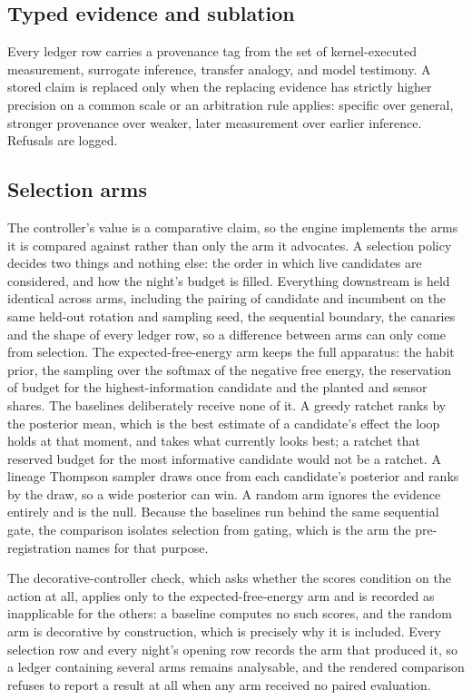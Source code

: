 \subsection{Typed evidence and sublation}
Every ledger row carries a provenance tag from the set of kernel-executed measurement, surrogate inference, transfer analogy, and model testimony. A stored claim is replaced only when the replacing evidence has strictly higher precision on a common scale or an arbitration rule applies: specific over general, stronger provenance over weaker, later measurement over earlier inference. Refusals are logged.

\subsection{Selection arms}
The controller's value is a comparative claim, so the engine implements the arms it is compared against rather than
only the arm it advocates. A selection policy decides two things and nothing else: the order in which live
candidates are considered, and how the night's budget is filled. Everything downstream is held identical across
arms, including the pairing of candidate and incumbent on the same held-out rotation and sampling seed, the
sequential boundary, the canaries and the shape of every ledger row, so a difference between arms can only come
from selection. The expected-free-energy arm keeps the full apparatus: the habit prior, the sampling over the
softmax of the negative free energy, the reservation of budget for the highest-information candidate and the
planted and sensor shares. The baselines deliberately receive none of it. A greedy ratchet ranks by the posterior
mean, which is the best estimate of a candidate's effect the loop holds at that moment, and takes what currently
looks best; a ratchet that reserved budget for the most informative candidate would not be a ratchet. A lineage
Thompson sampler draws once from each candidate's posterior and ranks by the draw, so a wide posterior can win. A
random arm ignores the evidence entirely and is the null. Because the baselines run behind the same sequential
gate, the comparison isolates selection from gating, which is the arm the pre-registration names for that purpose.

The decorative-controller check, which asks whether the scores condition on the action at all, applies only to the
expected-free-energy arm and is recorded as inapplicable for the others: a baseline computes no such scores, and
the random arm is decorative by construction, which is precisely why it is included. Every selection row and every
night's opening row records the arm that produced it, so a ledger containing several arms remains analysable, and
the rendered comparison refuses to report a result at all when any arm received no paired evaluation.

